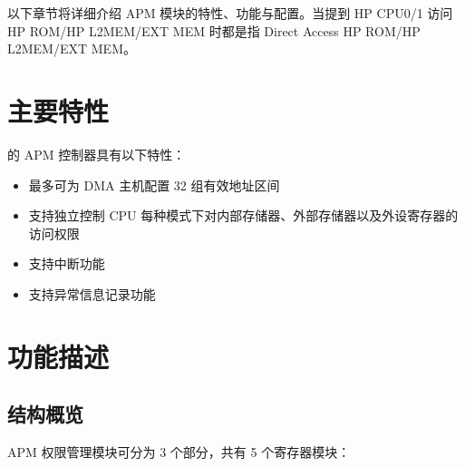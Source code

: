 \documentclass[main\_\_CN.tex]{subfiles}
\begin{document}
以下章节将详细介绍 APM 模块的特性、功能与配置。当提到 HP CPU0/1
访问 HP ROM/HP L2MEM/EXT MEM 时都是指 Direct Access HP ROM/HP L2MEM/EXT MEM。

\section{主要特性}

\chipname{} 的 APM 控制器具有以下特性：

\begin{itemize}
    \item 最多可为 DMA 主机配置 32 组有效地址区间
    \item 支持独立控制 CPU 每种模式下对内部存储器、外部存储器以及外设寄存器的访问权限
    \item 支持中断功能
    \item 支持异常信息记录功能
\end{itemize}

\section{功能描述}

\subsection{结构概览}\label{sec:permcrtl-apm-structure}

APM 权限管理模块可分为 3 个部分，共有 5 个寄存器模块：
\end{document}
